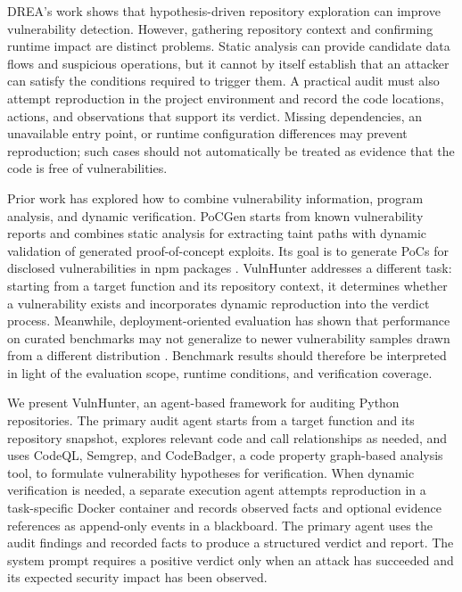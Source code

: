 \documentclass[10pt,a4paper]{article}
\begin{document}
DREA's work shows that hypothesis-driven repository exploration can improve vulnerability detection. However, gathering repository context and confirming runtime impact are distinct problems. Static analysis can provide candidate data flows and suspicious operations, but it cannot by itself establish that an attacker can satisfy the conditions required to trigger them. A practical audit must also attempt reproduction in the project environment and record the code locations, actions, and observations that support its verdict. Missing dependencies, an unavailable entry point, or runtime configuration differences may prevent reproduction; such cases should not automatically be treated as evidence that the code is free of vulnerabilities.

Prior work has explored how to combine vulnerability information, program analysis, and dynamic verification. PoCGen starts from known vulnerability reports and combines static analysis for extracting taint paths with dynamic validation of generated proof-of-concept exploits. Its goal is to generate PoCs for disclosed vulnerabilities in npm packages \cite{simsek2026pocgen}. VulnHunter addresses a different task: starting from a target function and its repository context, it determines whether a vulnerability exists and incorporates dynamic reproduction into the verdict process. Meanwhile, deployment-oriented evaluation has shown that performance on curated benchmarks may not generalize to newer vulnerability samples drawn from a different distribution \cite{lu2025lab}. Benchmark results should therefore be interpreted in light of the evaluation scope, runtime conditions, and verification coverage.

We present VulnHunter, an agent-based framework for auditing Python repositories. The primary audit agent starts from a target function and its repository snapshot, explores relevant code and call relationships as needed, and uses CodeQL, Semgrep, and CodeBadger, a code property graph-based analysis tool, to formulate vulnerability hypotheses for verification. When dynamic verification is needed, a separate execution agent attempts reproduction in a task-specific Docker container and records observed facts and optional evidence references as append-only events in a blackboard. The primary agent uses the audit findings and recorded facts to produce a structured verdict and report. The system prompt requires a positive verdict only when an attack has succeeded and its expected security impact has been observed.
\end{document}
